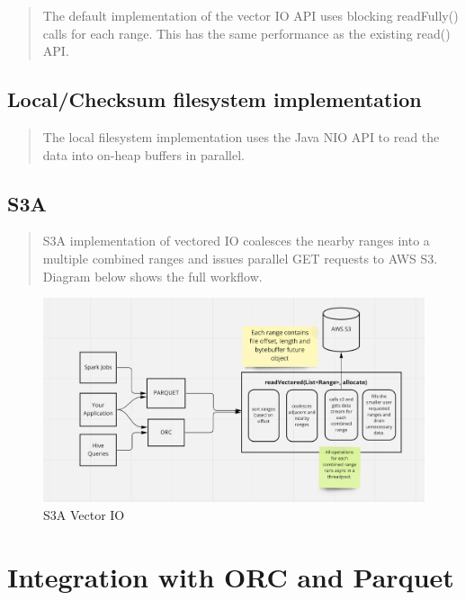 \documentclass[manuscript]{acmart}
\begin{document}
\begin{quotation}
The default implementation of the vector IO API uses blocking readFully() calls
for each range. This has the same performance as the existing read() API.
\end{quotation}

\subsection{Local/Checksum filesystem implementation}
\begin{quotation}

The local filesystem implementation uses the Java NIO API to read the data
into on-heap buffers in parallel.
\end{quotation}

\subsection{S3A}
\begin {quotation}

S3A implementation of vectored IO coalesces the nearby ranges into a multiple
combined ranges and issues parallel GET requests to AWS S3. Diagram below shows
the full workflow.

\end{quotation}
\begin{figure}
  \includegraphics[width=\linewidth]{vectored_io_s3a_flow.png}
  \caption{S3A Vector IO}
  \label{fig:s3a-vector-io}
\end{figure}

\section{Integration with ORC and Parquet}
\label{sec:integration}
\end{document}
